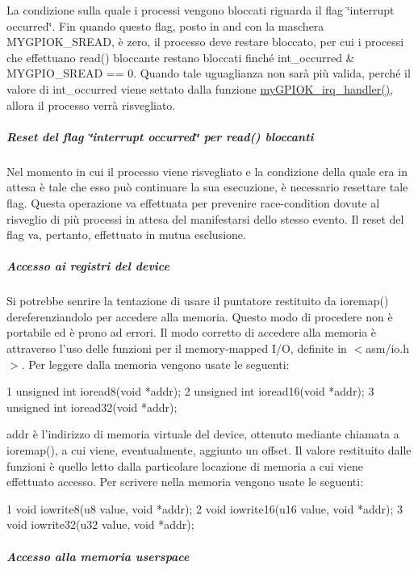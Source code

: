 La condizione sulla quale i processi vengono bloccati riguarda il flag \char`\"{}interrupt occurred\char`\"{}. Fin quando questo flag, posto in and con la maschera M\+Y\+G\+P\+I\+O\+K\+\_\+\+S\+R\+E\+A\+D, è zero, il processo deve restare bloccato, per cui i processi che effettuano read() bloccante restano bloccati finché int\+\_\+occurred \& M\+Y\+G\+P\+I\+O\+\_\+\+S\+R\+E\+A\+D == 0. Quando tale uguaglianza non sarà più valida, perché il valore di int\+\_\+occurred viene settato dalla funzione \hyperlink{group___linux-_driver_ga2fc230a12a97aa63e43b2dc4aec73511}{my\+G\+P\+I\+O\+K\+\_\+irq\+\_\+handler()}, allora il processo verrà risvegliato.

\subparagraph*{Reset del flag \char`\"{}interrupt occurred\char`\"{} per read() bloccanti}

Nel momento in cui il processo viene risvegliato e la condizione della quale era in attesa è tale che esso può continuare la sua esecuzione, è necessario resettare tale flag. Questa operazione va effettuata per prevenire race-\/condition dovute al risveglio di più processi in attesa del manifestarsi dello stesso evento. Il reset del flag va, pertanto, effettuato in mutua esclusione.

\subparagraph*{Accesso ai registri del device}

Si potrebbe senrire la tentazione di usare il puntatore restituito da ioremap() dereferenziandolo per accedere alla memoria. Questo modo di procedere non è portabile ed è prono ad errori. Il modo corretto di accedere alla memoria è attraverso l'uso delle funzioni per il memory-\/mapped I/\+O, definite in $<$asm/io.\+h$>$. Per leggere dalla memoria vengono usate le seguenti\+: 
\begin{DoxyCode}
1 unsigned int ioread8(void *addr);
2 unsigned int ioread16(void *addr);
3 unsigned int ioread32(void *addr);
\end{DoxyCode}
 addr è l'indirizzo di memoria virtuale del device, ottenuto mediante chiamata a ioremap(), a cui viene, eventualmente, aggiunto un offset. Il valore restituito dalle funzioni è quello letto dalla particolare locazione di memoria a cui viene effettuato accesso. Per scrivere nella memoria vengono usate le seguenti\+: 
\begin{DoxyCode}
1 void iowrite8(u8 value, void *addr);
2 void iowrite16(u16 value, void *addr);
3 void iowrite32(u32 value, void *addr);
\end{DoxyCode}


\subparagraph*{Accesso alla memoria userspace}

